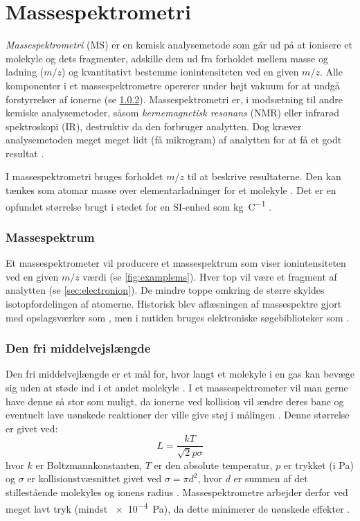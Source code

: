 \chapter{Massespektrometri}
\emph{Massespektrometri} (MS) er en kemisk analysemetode som går ud på at ionisere et molekyle og dets fragmenter, adskille dem ud fra forholdet mellem masse og ladning ($m/z$) og kvantitativt bestemme ionintensiteten ved en given $m/z$.
Alle komponenter i et massespektrometre opererer under højt vakuum for at undgå forstyrrelser af ionerne (se \cref{subsec:freelength}).
Massespektrometri er, i modsætning til andre kemiske analysemetoder, såsom \emph{kernemagnetisk resonans} (NMR) eller infrarød spektroskopi (IR), destruktiv da den forbruger analytten.
Dog kræver analysemetoden meget meget lidt (få mikrogram) af analytten for at få et godt resultat \parencite{mstextbook}.
\par I massespektrometri bruges forholdet $m/z$ til at beskrive resultaterne.
Den kan tænkes som atomar masse over elementarladninger for et molekyle \parencite{chemana}.
Det er en opfundet størrelse brugt i stedet for en SI-enhed som \unit[per-mode=power]{\kilogram\per\coulomb} \parencite{mstextbook}.
\subsection{Massespektrum}

Et massespektrometer vil producere et massespektrum som viser ionintensiteten ved en given $m/z$ værdi (se \cref{fig:examplems}).
Hver top vil være et fragment af analytten (se \cref{sec:electronion}).
De mindre toppe omkring de større skyldes isotopfordelingen af atomerne.
Historisk blev aflæsningen af massespektre gjort med opslagsværker som  \parencite{massspectra},
men i nutiden bruges elektroniske søgebiblioteker som  \parencite{nist23}.
\subsection{Den fri middelvejslængde}\label{subsec:freelength}
Den fri middelvejlængde er et mål for, hvor langt et molekyle i en gas kan bevæge sig uden at støde ind i et andet molekyle \parencite{knudsenstrømning}.
I et massespektrometer vil man gerne have denne så stor som muligt, da ionerne ved kollision vil ændre deres bane og eventuelt lave uønskede reaktioner der ville give støj i målingen \parencite{massspec}.
Denne størrelse er givet ved:
\begin{equation}
	L = \frac{kT}{\sqrt{2}p\sigma}
\end{equation}
hvor $k$ er Boltzmannkonstanten, $T$ er den absolute temperatur, $p$ er trykket (i \unit{\pascal}) og $\sigma$ er kollisionstvæsnittet givet ved $\sigma = \pi d^2$,
hvor $d$ er summen af det stillestående molekyles og ionens radius \parencite{massspec}.
Massespektrometre arbejder derfor ved meget lavt tryk (mindst \qty{e-4}{\pascal}), da dette minimerer de uønskede effekter \parencite{mstextbook}.

